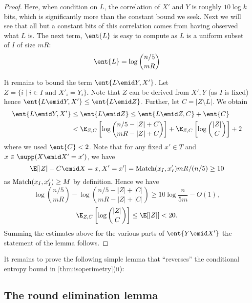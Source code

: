 \begin{proof}
Here, when condition on $L$, the correlation of $X'$ and $Y$
is roughly $10\log k$ bits, which is significantly more than the
constant bound we seek. Next we will see that all but a constant bits
of this correlation comes from having observed what $L$ is.
The next term, $\ent{L}$ is easy to compute as $L$ is a uniform
subset of $I$ of size $mR$:
\begin{align*}
\ent{L}=\log{n/5\choose mR}
\end{align*}

It remains to bound the term $\ent{L\emid Y, X'}$. Let
$Z=\{i\mid i\in I \text{ and } X'_i=Y_i\}$. Note that $Z$ can be
derived from $X',Y$ (as $I$ is fixed) hence 
$\ent{L\emid Y,X'}\leq \ent{L\emid Z}$. 
Further, let $C=|Z\setminus L|$. We obtain
\begin{align*}
\ent{L\emid Y,X'}&\le\ent{L\emid Z}\leq \ent{L\emid Z, C} + \ent{C}\\
&< \E_{Z,C}\left[\log{n/5-|Z|+C \choose mR - |Z|+C}\right]
+ \E_{Z,C}\left[\log {|Z| \choose C}\right]+2
\end{align*}
where we used $\ent{C}<2$. Note that for any fixed $x'\in T$ and
$x\in \supp(X\emid X'=x')$, we have $$\E[|Z|-C\emid X=x,
X'=x']=\Match(x_I,x_I') mR /(n/5) \geq 10$$ as $\operatorname{Match}(x_I,
x_I')\geq M$ by definition.
Hence we have $$\log{n/5\choose mR}-\log{n/5-|Z|+|C|\choose
mR-|Z|+|C|}\ge10\log\frac n{5m}-O(1),$$ $$\E_{Z,C}\left[\log
{|Z| \choose C}\right] \le \E[|Z|] < 20.$$ Summing the estimates
above for the various parts of $\ent{Y\emid X'}$ the statement
of the lemma follows.
\end{proof}

It remains to prove the following simple lemma that ``reverses''
the conditional entropy bound in \autoref{thm:isoperimetry}(ii):

\subsection{The round elimination lemma}

